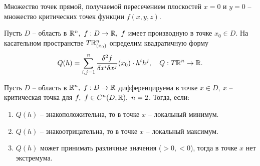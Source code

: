 Множество точек прямой, получаемой пересечением плоскостей $x = 0$ и $y = 0$ -- множество критических точек функции $f(x,y,z)$.

\begin{definition}
    Пусть $ D $ -- область в $ \R^n, \ f: D \rightarrow\R, \ f $ имеет производную в точке $ x_0 \in D $. На касательном пространстве $ T\mathbb{R}_{(x_0)}^n $ определим квадратичную форму
    \[
        Q(h) = \sum_{i,j = 1}^{n}\frac{\delta^2f}{\delta x^i\delta x^j}(x_0)\cdot h^ih^j,\quad Q:T\mathbb{R}^n \rightarrow \mathbb{R}.
    \]
\end{definition}

\begin{theorem}
    Пусть $D$ -- область в $\mathbb{R}^n, \ f: D \rightarrow \mathbb{R}$ дифференцируема в точке $x \in D, \ x$ -- критическая точка для $f, \ f \in C^n(D,\mathbb{R}), \ n = 2$. Тогда, если:
    \begin{enumerate}
        \item $Q(h)$ -- знакоположительна, то в точке $x$ -- локальный минимум.
        \item $Q(h)$ -- знакоотрицательна, то в точке $x$ -- локальный максимум.
        \item $Q(h)$ может принимать различные значения ($>0, < 0$), тогда в точке $x$ нет экстремума.
    \end{enumerate}
\end{theorem}

